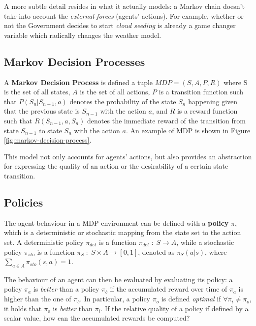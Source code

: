 A more subtle detail resides in what it actually models: a Markov chain doesn't take into account the \textit{external forces} (agents' actions). For example, whether or not the Government decides to start \textit{cloud seeding} is already a game changer variable which radically changes the weather model.


\subsection{Markov Decision Processes}

A \textbf{Markov Decision Process} is defined a tuple $MDP = (S, A, P, R)$ where S is the set of all states, $A$ is the set of all actions, $P$ is a transition function such that $P(S_n | S_{n-1}, a)$ denotes the probability of the state $S_n$ happening given that the previous state is $S_{n-1}$ with the action $a$, and $R$ is a reward function such that $R(S_{n-1}, a, S_{n})$ denotes the immediate reward of the transition from state $S_{n-1}$ to state $S_n$ with the action $a$. An example of MDP is shown in Figure \ref{fig:markov-decision-process}.

This model not only accounts for agents' actions, but also provides an abstraction for expressing the quality of an action or the desirability of a certain state transition.


\subsection{Policies}

The agent behaviour in a MDP environment can be defined with a \textbf{policy} $\pi$, which is a deterministic or stochastic mapping from the state set to the action set.
A deterministic policy $\pi_{det}$ is a function $\pi_{det} \; : \; S \rightarrow A$, while a stochastic policy $\pi_{sto}$ is a function $\pi _ {S} \; : \; S \times A \rightarrow [0, 1]$, denoted as $\pi _ {S}(a | s)$, where $\sum_{a \in A} \pi _ {sto} (s, a) = 1$.

The behaviour of an agent can then be evaluated by evaluating its policy: a policy $\pi _ a$ is \textit{better} than a policy $\pi _ b$ if the accumulated reward over time of $\pi _ a$ is higher than the one of $\pi _ b$.
In particular, a policy $\pi _ o$ is defined \textit{optimal} if $\forall \pi _ i \neq \pi _ o$, it holds that $\pi _o $ is \textit{better} than $\pi _ i$.
If the relative quality of a policy if defined by a scalar value, how can the accumulated rewards be computed?

